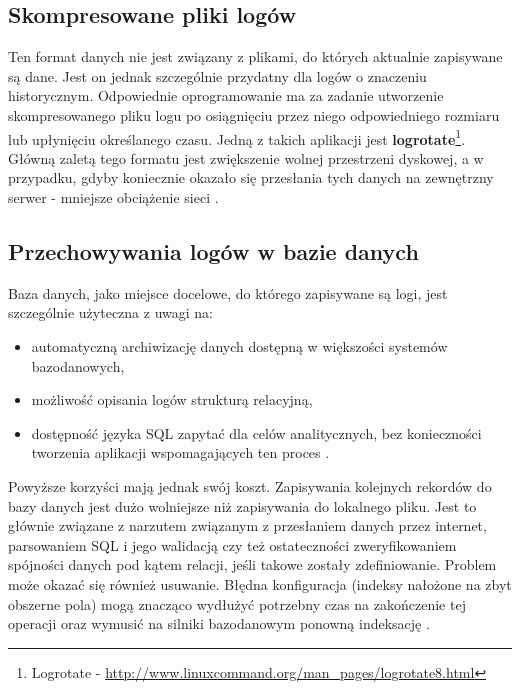     \subsection{Skompresowane pliki logów}
    \label{chapter:logs:history:compressed_log_format}
    Ten format danych nie jest związany z plikami, do których aktualnie zapisywane są dane.
    Jest on jednak szczególnie przydatny dla logów o znaczeniu historycznym. Odpowiednie
    oprogramowanie ma za zadanie utworzenie skompresowanego pliku logu po osiągnięciu przez niego
    odpowiedniego rozmiaru lub upłynięciu określanego czasu. Jedną z takich aplikacji jest 
    \textbf{logrotate}\footnote{Logrotate - \url{http://www.linuxcommand.org/man_pages/logrotate8.html}}.
    Główną zaletą tego formatu jest zwiększenie wolnej przestrzeni dyskowej, a w przypadku, gdyby koniecznie
    okazało się przesłania tych danych na zewnętrzny serwer - mniejsze obciążenie sieci \cite{logging_log_management}.
 
    \subsection{Przechowywania logów w bazie danych}
    \label{chapter:logs:history:db_format}
    Baza danych, jako miejsce docelowe, do którego zapisywane są logi, jest szczególnie użyteczna z uwagi na:
    \begin{itemize}
        \item automatyczną archiwizację danych dostępną w większości systemów bazodanowych,
        \item możliwość opisania logów strukturą relacyjną,
        \item dostępność języka SQL zapytać dla celów analitycznych, bez konieczności tworzenia aplikacji
        wspomagających ten proces \cite{logging_log_management}.
    \end{itemize}
    Powyższe korzyści mają jednak swój koszt. Zapisywania kolejnych rekordów do bazy danych jest 
    dużo wolniejsze niż zapisywania do lokalnego pliku. Jest to głównie związane z narzutem związanym
    z przesłaniem danych przez internet, parsowaniem SQL i jego walidacją czy też ostateczności
    zweryfikowaniem spójności danych pod kątem relacji, jeśli takowe zostały zdefiniowanie.
    Problem może okazać się również usuwanie. Błędna konfiguracja (indeksy nałożone na zbyt obszerne pola) mogą 
    znacząco wydłużyć potrzebny czas na zakończenie tej operacji oraz wymusić na silniki bazodanowym ponowną
    indeksację \cite{logging_log_management}.